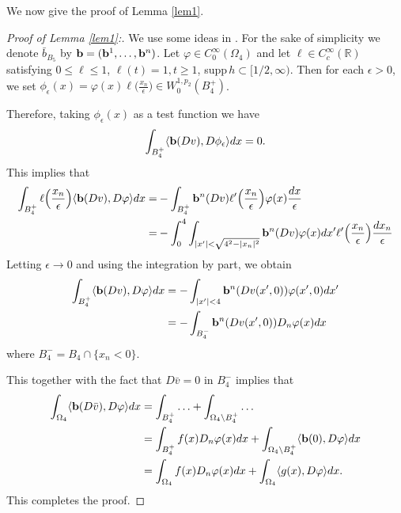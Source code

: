 \documentclass[a4paper,10pt]{amsart}
\newcommand{\f}{\frac}
\newcommand{\Om}{\Omega}
\newcommand{\vc}{\infty}
\begin{document}
We now give the proof of Lemma \ref{lem1}.
\begin{proof}
	[Proof of Lemma \ref{lem1}:] We use some ideas in \cite{Ph}. For the sake of simplicity we denote $\bar{b}_{B_5}$ by ${\bf b}=({\bf b}^1,\ldots,{\bf b}^n)$. 	Let $\varphi\in C_0^\vc(\Om_{4})$ and let $\ell\in C_c^\vc(\mathbb{R})$ satisfying $0\leq \ell\leq 1$, $\ell(t)=1, t\geq 1$, supp\,$h\subset [1/2,\vc)$. Then for each $\epsilon>0$, we set   $\phi_\epsilon(x)=\varphi(x)\ell\Big(\f{x_n}{\epsilon}\Big)\in W^{1,p_2}_0(B_4^+)$.
	
	Therefore, taking $\phi_\epsilon(x)$ as a test function we have
	$$
	\begin{aligned}
	\int_{B_4^+}\langle{\bf b}(Dv),D\phi_\epsilon\rangle dx=0.
	\end{aligned}
	$$
	This implies that
	$$
	\begin{aligned}
	\int_{B_4^+}\ell\Big(\f{x_n}{\epsilon}\Big) \langle{\bf b}(Dv),D\varphi\rangle dx
	=&-\int_{B_4^+}{\bf b}^n(Dv)\ell'\Big(\f{x_n }{\epsilon}\Big)\varphi(x)\f{dx}{\epsilon}\\
	=&-\int_{0}^{4}\int_{|x'|<\sqrt{4^2-|x_n|^2}}{\bf b}^n(Dv)\varphi(x)dx'\ell'\Big(\f{x_n }{\epsilon}\Big)\f{dx_n}{\epsilon}\\
	\end{aligned}
	$$
	Letting $\epsilon\to 0$ and using the integration by part, we obtain
	$$
	\begin{aligned}
	\int_{B_4^+}\langle{\bf b}(Dv),D\varphi\rangle dx
	&=-\int_{|x'|<4}{\bf b}^n(Dv(x',0))\varphi(x',0)dx'\\
	&=-\int_{B_4^-}{\bf b}^n(Dv(x',0))D_n\varphi(x)dx
	\end{aligned}
	$$
	where $B_4^-=B_4\cap \{x_n<0\}$.
	
	This together with the fact that $D\bar{v}=0$ in $B_4^-$ implies that
	$$
	\begin{aligned}
	\int_{\Om_{4}}\langle{\bf b}(D\bar{v}),D\varphi\rangle dx&=\int_{B_4^+}\ldots+\int_{\Om_4\backslash B_4^+}\ldots\\
	&=\int_{B_4^+}f(x)D_n\varphi(x)dx+\int_{\Om_4\backslash B_4^+}\langle{\bf b}(0),D\varphi\rangle dx\\
	&=\int_{\Om_{4}}f(x)D_n\varphi(x)dx+\int_{\Om_{4}}\langle g(x),D\varphi\rangle dx.
	\end{aligned}
	$$
	This completes the proof.
\end{proof}
\end{document}
